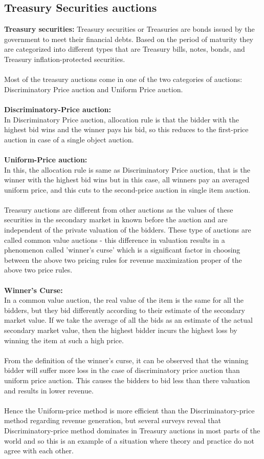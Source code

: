 \documentclass[a4paper]{article}
\begin{document}
\subsection*{Treasury Securities auctions}

\textbf{Treasury securities:} Treasury securities or Treasuries are bonds issued by the government to meet their financial debts. Based on the period of maturity they are categorized into different types that are Treasury bills, notes, bonds, and Treasury inflation-protected securities.
\\\\
Most of the treasury auctions come in one of the two categories of auctions: Discriminatory Price auction and Uniform Price auction.
\\\\
\textbf{Discriminatory-Price auction:} \\In Discriminatory Price auction, allocation rule is that the bidder with the highest bid wins and the winner pays his bid, so this reduces to the first-price auction in case of a single object auction.
\\\\
\textbf{Uniform-Price auction:} \\In this, the allocation rule is same as Discriminatory Price auction, that is the winner with the highest bid wins but in this case, all winners pay an averaged uniform price, and this cuts to the second-price auction in single item auction.
\\\\
Treasury auctions are different from other auctions as the values of these securities in the secondary market in known before the auction and are independent of the private valuation of the bidders. These type of auctions are called common value auctions - this difference in valuation results in a phenomenon called 'winner's curse' which is a significant factor in choosing between the above two pricing rules for revenue maximization proper of the above two price rules.
\\\\
\textbf{Winner's Curse:}\\ In a common value auction, the real value of the item is the same for all the bidders, but they bid differently according to their estimate of the secondary market value. If we take the average of all the bids as an estimate of the actual secondary market value, then the highest bidder incurs the highest loss by winning the item at such a high price.
\\\\
From the definition of the winner's curse, it can be observed that the winning bidder will suffer more loss in the case of discriminatory price auction than uniform price auction. This causes the bidders to bid less than there valuation and results in lower revenue.
\\\\
Hence the Uniform-price method is more efficient than the Discriminatory-price method regarding revenue generation, but several surveys reveal that Discriminatory-price method dominates in Treasury auctions in most parts of the world and so this is an example of a situation where theory and practice do not agree with each other.
\end{document}
